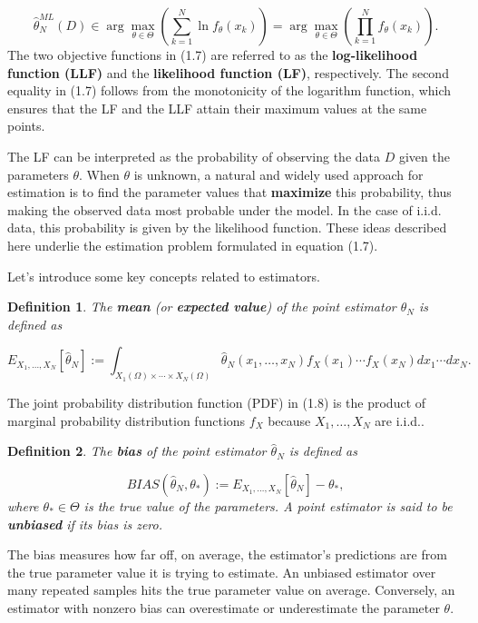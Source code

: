 \documentclass{report}
\newtheorem{definition}{Definition}[chapter]
\begin{document}
\begin{equation}
\hat{\theta}^{ML}_N(D) \in \arg \max_{\theta \in \Theta} \left(\sum_{k=1}^N \ln f_\theta(x_k)\right) = \arg \max_{\theta \in \Theta} \left(\prod_{k=1}^N f_\theta(x_k) \right).
\end{equation}
The two objective functions in (1.7) are referred to as the \textbf{log-likelihood function (LLF)} and the \textbf{likelihood function (LF)}, respectively. The second equality in (1.7) follows from the monotonicity of the logarithm function, which ensures that the LF and the LLF attain their maximum values at the same points.

The LF can be interpreted as the probability of observing the data $D$ given the parameters $\theta$. When $\theta$ is unknown, a natural and widely used approach for estimation is to find the parameter values that \textbf{maximize} this probability, thus making the observed data most probable under the model. In the case of i.i.d. data, this probability is given by the likelihood function. These ideas described here underlie the estimation problem formulated in equation (1.7).

Let’s introduce some key concepts related to estimators.

\begin{definition}
The \textbf{mean} (or \textbf{expected value}) of the point estimator $\hat{\theta}_N$ is defined as

\begin{equation}
E_{X_1,\dots,X_N}[\hat{\theta}_N] := \int_{X_1(\Omega)\times \cdots \times X_N(\Omega)} \hat{\theta}_N(x_1,\dots,x_N)f_X(x_1)\cdots f_X(x_N) dx_1\cdots dx_N.
\end{equation}
\end{definition}
The joint probability distribution function (PDF) in (1.8) is the product of marginal probability distribution functions $f_X$ because $X_1,\dots,X_N$ are i.i.d..

\begin{definition}
The \textbf{bias} of the point estimator $\hat{\theta}_N$ is defined as

\begin{equation}
BIAS(\hat{\theta}_N,\theta_*) := E_{X_1,\dots,X_N}[\hat{\theta}_N] - \theta_*,
\end{equation}
where $\theta_* \in \Theta$ is the true value of the parameters. A point estimator is said to be \textbf{unbiased} if its bias is zero.
\end{definition}
The bias measures how far off, on average, the estimator's predictions are from the true parameter value it is trying to estimate. An unbiased estimator over many repeated samples hits the true parameter value on average. Conversely, an estimator with nonzero bias can overestimate or underestimate the parameter $\theta$.
\end{document}
